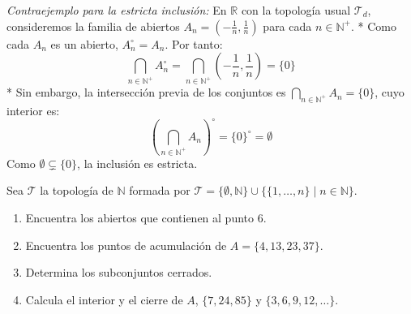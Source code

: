 \begin{sol}
\begin{enumerate}[label=\arabic*)]
        \textit{Contraejemplo para la estricta inclusión:}
        En $\mathbb{R}$ con la topología usual $\mathcal{T}_d$, consideremos la familia de abiertos $A_n = (-\frac{1}{n}, \frac{1}{n})$ para cada $n \in \mathbb{N}^+$.
        * Como cada $A_n$ es un abierto, $A_n^\circ = A_n$. Por tanto:
          \[
              \bigcap_{n \in \mathbb{N}^+} A_n^\circ = \bigcap_{n \in \mathbb{N}^+} \left(-\frac{1}{n}, \frac{1}{n}\right) = \{0\}
          \]
        * Sin embargo, la intersección previa de los conjuntos es $\bigcap_{n \in \mathbb{N}^+} A_n = \{0\}$, cuyo interior es:
          \[
              \left(\bigcap_{n \in \mathbb{N}^+} A_n\right)^\circ = \{0\}^\circ = \emptyset
          \]
        Como $\emptyset \subsetneq \{0\}$, la inclusión es estricta.
    \end{enumerate}
\end{sol}

\begin{ejer}
    [40] Sea $\mathcal{T}$ la topología de $\mathbb{N}$ formada por $\mathcal{T} = \{\emptyset, \mathbb{N}\} \cup \{\{1, \dots, n\} \mid n \in \mathbb{N}\}$.
    \begin{enumerate}[label=\alph*)]
        \item Encuentra los abiertos que contienen al punto $6$.
        \item Encuentra los puntos de acumulación de $A = \{4, 13, 23, 37\}$.
        \item Determina los subconjuntos cerrados.
        \item Calcula el interior y el cierre de $A$, $\{7, 24, 85\}$ y $\{3, 6, 9, 12, \dots\}$.
    \end{enumerate}
\end{ejer}

